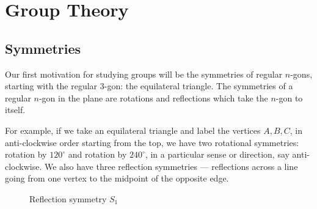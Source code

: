 \setchaptergraphic{}

\chapter{Group Theory}
\label{ch:groups}

\section{Symmetries}

Our first motivation for studying groups will be the symmetries of regular $n$-gons, starting with the regular $3$-gon: the equilateral triangle. The symmetries of a regular $n$-gon in the plane are rotations and reflections which take the $n$-gon to itself.

For example, if we take an equilateral triangle and label the vertices $A, B, C$, in anti-clockwise order starting from the top, we have two rotational symmetries: rotation by $120^\circ$ and rotation by $240^\circ$, in a particular sense or direction, say anti-clockwise. We also have three reflection symmetries --- reflections across a line going from one vertex to the midpoint of the opposite edge.

\begin{figure}[ht!]
    \centering
\caption{Reflection symmetry $S_1$}
\label{fig:triangle-reflection}
\end{figure}

